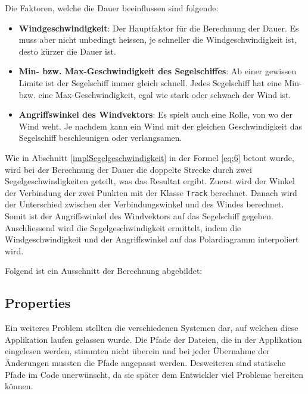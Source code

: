 Die Faktoren, welche die Dauer beeinflussen sind folgende:

\begin{itemize}
\item \textbf{Windgeschwindigkeit}: Der Hauptfaktor für die Berechnung der
Dauer. Es muss aber nicht unbedingt heissen, je schneller die
Windgeschwindigkeit ist, desto kürzer die Dauer ist.

\item \textbf{Min- bzw. Max-Geschwindigkeit des Segelschiffes}: Ab einer
gewissen Limite ist der Segelschiff immer gleich schnell. Jedes Segelschiff
hat eine Min- bzw. eine Max-Geschwindigkeit, egal wie stark oder schwach der
Wind ist.

\item \textbf{Angriffswinkel des Windvektors}: Es spielt auch eine Rolle, von
wo der Wind weht. Je nachdem kann ein Wind mit der gleichen Geschwindigkeit
das Segelschiff beschleunigen oder verlangsamen.
\end{itemize}

Wie in Abschnitt \ref{implSegelgeschwindigkeit} in der Formel \eqref{eq:6}
betont wurde, wird bei der Berechnung der Dauer die doppelte Strecke durch
zwei Segelgeschwindigkeiten geteilt, was das Resultat ergibt. Zuerst wird der
Winkel der Verbindung der zwei Punkten mit der Klasse \texttt{Track} berechnet.
Danach wird der Unterschied zwischen der Verbindungswinkel und des Windes
berechnet. Somit ist der Angriffswinkel des Windvektors auf das Segelschiff
gegeben. Anschliessend wird die Segelgeschwindigkeit ermittelt, indem die
Windgeschwindigkeit und der Angriffswinkel auf das Polardiagramm interpoliert
wird.

Folgend ist ein Ausschnitt der Berechnung abgebildet:



\subsection{Properties}
Ein weiteres Problem stellten die verschiedenen Systemen dar, auf welchen
diese Applikation laufen gelassen wurde. Die Pfade der Dateien, die in der
Applikation eingelesen werden, stimmten nicht überein und bei jeder Übernahme
der Änderungen mussten die Pfade angepasst werden. Desweiteren sind statische
Pfade im Code unerwünscht, da sie später dem Entwickler viel Probleme bereiten
können. 

